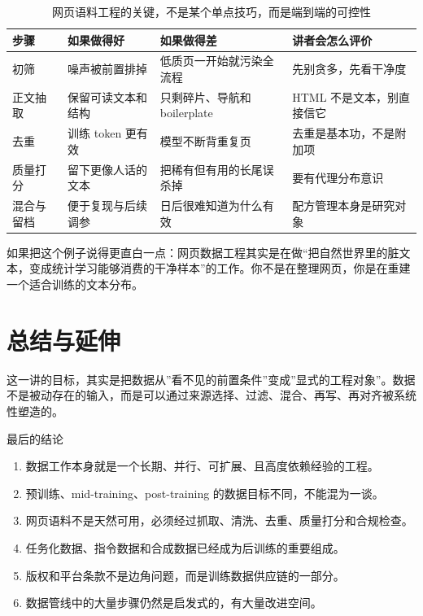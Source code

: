 \documentclass[a4paper]{article}
\begin{document}
\begin{table}[H]
\centering
\begin{tabular}{p{}p{}p{}p{}}
\toprule
\textbf{步骤} & \textbf{如果做得好} & \textbf{如果做得差} & \textbf{讲者会怎么评价} \\
\midrule
初筛 & 噪声被前置排掉 & 低质页一开始就污染全流程 & 先别贪多，先看干净度 \\
正文抽取 & 保留可读文本和结构 & 只剩碎片、导航和 boilerplate & HTML 不是文本，别直接信它 \\
去重 & 训练 token 更有效 & 模型不断背重复页 & 去重是基本功，不是附加项 \\
质量打分 & 留下更像人话的文本 & 把稀有但有用的长尾误杀掉 & 要有代理分布意识 \\
混合与留档 & 便于复现与后续调参 & 日后很难知道为什么有效 & 配方管理本身是研究对象 \\
\bottomrule
\end{tabular}
\caption{网页语料工程的关键，不是某个单点技巧，而是端到端的可控性}
\end{table}

如果把这个例子说得更直白一点：网页数据工程其实是在做“把自然世界里的脏文本，变成统计学习能够消费的干净样本”的工作。你不是在整理网页，你是在重建一个适合训练的文本分布。

\section{总结与延伸}

这一讲的目标，其实是把数据从”看不见的前置条件”变成”显式的工程对象”。数据不是被动存在的输入，而是可以通过来源选择、过滤、混合、再写、再对齐被系统性塑造的。

\begin{importantbox}{最后的结论}
\begin{enumerate}
    \item 数据工作本身就是一个长期、并行、可扩展、且高度依赖经验的工程。
    \item 预训练、mid-training、post-training 的数据目标不同，不能混为一谈。
    \item 网页语料不是天然可用，必须经过抓取、清洗、去重、质量打分和合规检查。
    \item 任务化数据、指令数据和合成数据已经成为后训练的重要组成。
    \item 版权和平台条款不是边角问题，而是训练数据供应链的一部分。
    \item 数据管线中的大量步骤仍然是启发式的，有大量改进空间。
\end{enumerate}
\end{importantbox}
\end{document}
